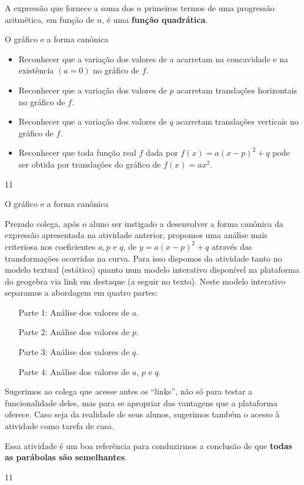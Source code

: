 \begin{observation}{}

A expressão que fornece a soma dos \(n\) primeiros termos de uma progressão aritmética, em função de \(n\), é uma \textbf{função quadrática}.
\end{observation}

\cleardoublepage
\def\currentcolor{session1}
\begin{objectives}{O gráfico e a forma canônica}
{
\begin{itemize}
\item Reconhecer que a variação dos valores de a acarretam na concavidade e na existência $(a=0)$ no gráfico de $f$.
\item Reconhecer que a variação dos valores de $p$ acarretam translações horizontais no gráfico de $f$.
\item Reconhecer que a variação dos valores de $q$ acarretam translações verticais no gráfico de $f$.
\item Reconhecer que toda função real $f$ dada por $f(x)=a(x−p)^2+q$ pode ser obtida por translações do gráfico de $f(x)=ax^2$.
\end{itemize}
}{1}{1}
\end{objectives}
\begin{sugestions}{O gráfico e a forma canônica}
{
Prezado colega, após o aluno ser instigado a desenvolver a forma canônica da expressão apresentada na atividade anterior, propomos uma análise mais criteriosa nos coeficientes $a, p$ e $q$, de $y=a(x−p)^2+q$ através das transformações ocorridas na curva. Para isso dispomos da atividade tanto no modelo textual (estático) quanto num modelo interativo disponível na plataforma do geogebra via link em destaque (a seguir no texto). Neste modelo interativo separamos a abordagem em quatro partes:

\begin{itemize}
\item[Parte 1:] Análise dos valores de $a$.
\item[Parte 2:] Análise dos valores de $p$.
\item[Parte 3:] Análise dos valores de $q$.
\item[Parte 4:] Análise dos valores de $a$, $p$ e $q$.
\end{itemize}

Sugerimos ao colega que acesse antes os “links”, não só para testar a funcionalidade deles, mas para se apropriar das vantagens que a plataforma oferece. Caso seja da realidade de seus alunos, sugerimos também o acesso à atividade como tarefa de casa.

Essa atividade é um boa referência para conduzirmos a conclusão de que \textbf{todas as parábolas são semelhantes}.
}{1}{1}
\end{sugestions}
